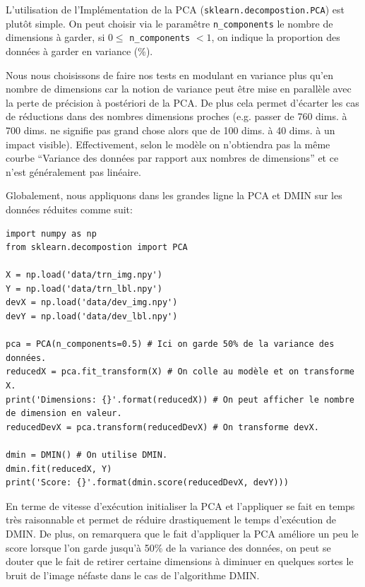 \documentclass[12pt,a4paper]{article}
\begin{document}
{L'utilisation de l'Implémentation de la PCA (\lstinline[style=default]|sklearn.decompostion.PCA|) est plutôt simple. 
On peut choisir via le paramêtre \lstinline[style=default]|n_components| le nombre de dimensions à garder, \linebreak[4] si $0 \leq$  \lstinline[style=default]|n_components| $< 1$, on indique la proportion des données à garder en variance (\%).

Nous nous choisissons de faire nos tests en modulant en variance plus qu'en nombre de dimensions car la notion de variance peut être mise en parallèle avec la perte de précision à postériori de la PCA.
De plus cela permet d'écarter les cas de réductions dans des nombres dimensions proches (e.g. passer de 760 dims. à 700 dims. ne signifie pas grand chose alors que de 100 dims. à 40 dims. à un impact visible). Effectivement, selon le modèle on n'obtiendra pas la même courbe ``Variance des données par rapport aux nombres de dimensions'' et ce n'est généralement pas linéaire.

Globalement, nous appliquons dans les grandes ligne la PCA et DMIN sur les données réduites comme suit:
\begin{lstlisting}[style=darkula]
import numpy as np
from sklearn.decompostion import PCA

X = np.load('data/trn_img.npy')
Y = np.load('data/trn_lbl.npy')
devX = np.load('data/dev_img.npy')
devY = np.load('data/dev_lbl.npy')

pca = PCA(n_components=0.5) # Ici on garde 50% de la variance des données.
reducedX = pca.fit_transform(X) # On colle au modèle et on transforme X.
print('Dimensions: {}'.format(reducedX)) # On peut afficher le nombre de dimension en valeur.
reducedDevX = pca.transform(reducedDevX) # On transforme devX.

dmin = DMIN() # On utilise DMIN.
dmin.fit(reducedX, Y)
print('Score: {}'.format(dmin.score(reducedDevX, devY)))

\end{lstlisting}

En terme de vitesse d'exécution initialiser la PCA et l'appliquer se fait en temps très raisonnable et permet de réduire drastiquement le temps d'exécution de DMIN. De plus, on remarquera que le fait d'appliquer la PCA améliore un peu le score lorsque l'on garde jusqu'à 50\% de la variance des données, on peut se douter que le fait de retirer certaine dimensions à diminuer en quelques sortes le bruit de l'image néfaste dans le cas de l'algorithme DMIN.


}
\end{document}
